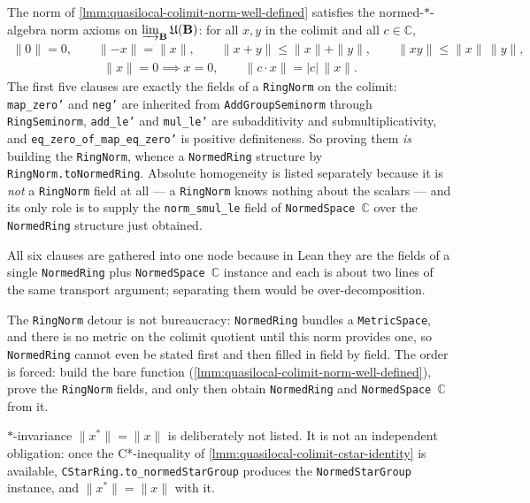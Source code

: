 \begin{lemma}
    \label{lmm:quasilocal-colimit-norm-axioms}
    \leanok
    The norm of \ref{lmm:quasilocal-colimit-norm-well-defined} satisfies the normed-$*$-algebra norm axioms on $\varinjlim_{\mathbf{B}} \mathfrak{U}(\mathbf{B})$: for all $x, y$ in the colimit and all $c \in \mathbb{C}$,
    \begin{align}
        \|0\| = 0, \qquad \|{-x}\| = \|x\|, \qquad \|x + y\| \le \|x\| + \|y\|, \qquad \|xy\| \le \|x\|\,\|y\|,
    \end{align}
    \begin{align}
        \|x\| = 0 \implies x = 0, \qquad \|c \cdot x\| = |c|\,\|x\|.
    \end{align}
    The first five clauses are exactly the fields of a \texttt{RingNorm} on the colimit: \texttt{map\_zero'} and \texttt{neg'} are inherited from \texttt{AddGroupSeminorm} through \texttt{RingSeminorm}, \texttt{add\_le'} and \texttt{mul\_le'} are subadditivity and submultiplicativity, and \texttt{eq\_zero\_of\_map\_eq\_zero'} is positive definiteness. So proving them \emph{is} building the \texttt{RingNorm}, whence a \texttt{NormedRing} structure by \texttt{RingNorm.toNormedRing}. Absolute homogeneity is listed separately because it is \emph{not} a \texttt{RingNorm} field at all --- a \texttt{RingNorm} knows nothing about the scalars --- and its only role is to supply the \texttt{norm\_smul\_le} field of \texttt{NormedSpace \ensuremath{\mathbb{C}}} over the \texttt{NormedRing} structure just obtained.

    All six clauses are gathered into one node because in Lean they are the fields of a single \texttt{NormedRing} plus \texttt{NormedSpace \ensuremath{\mathbb{C}}} instance and each is about two lines of the same transport argument; separating them would be over-decomposition.

    The \texttt{RingNorm} detour is not bureaucracy: \texttt{NormedRing} bundles a \texttt{MetricSpace}, and there is no metric on the colimit quotient until this norm provides one, so \texttt{NormedRing} cannot even be stated first and then filled in field by field. The order is forced: build the bare function (\ref{lmm:quasilocal-colimit-norm-well-defined}), prove the \texttt{RingNorm} fields, and only then obtain \texttt{NormedRing} and \texttt{NormedSpace \ensuremath{\mathbb{C}}} from it.

    $*$-invariance $\|x^{*}\| = \|x\|$ is deliberately not listed. It is not an independent obligation: once the C*-inequality of \ref{lmm:quasilocal-colimit-cstar-identity} is available, \texttt{CStarRing.to\_normedStarGroup} produces the \texttt{NormedStarGroup} instance, and $\|x^{*}\| = \|x\|$ with it.
\end{lemma}
